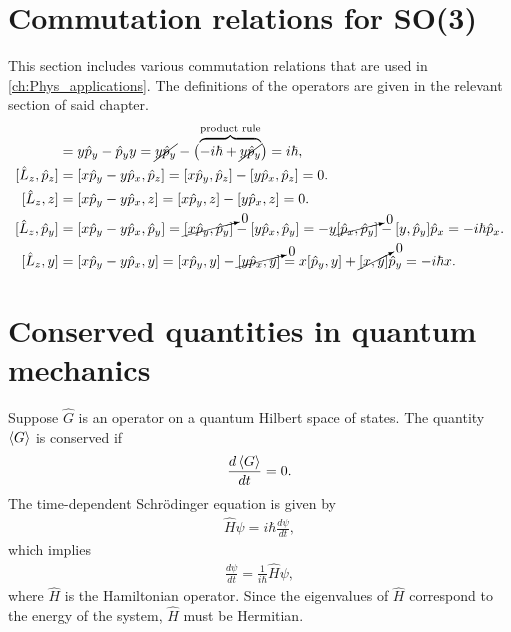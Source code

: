 \section{Commutation relations for SO(3)}\label{sec:SO3_comms}
This section includes various commutation relations that are used in \cref{ch:Phys_applications}. The definitions of the operators are given in the relevant section of said chapter.
\begin{align*}
    [y,\hat{p}_y] &= y\hat{p}_y - \hat{p}_y y = \cancel{y\hat{p}_y} - \bigl(\overbrace{-i\hbar + \cancel{y\hat{p}_y}}^{\textrm{product rule}}\bigr) = i\hbar, \\
    [\hat{L}_z,\hat{p}_z]
        &= [x\hat{p}_y - y\hat{p}_x, \hat{p}_z] = [x\hat{p}_y, \hat{p}_z] - [y\hat{p}_x, \hat{p}_z] = 0. \\
    [\hat{L}_z, z] &= [x\hat{p}_y - y\hat{p}_x, z] = [x\hat{p}_y, z] - [y\hat{p}_x, z] = 0. \\
    [\hat{L}_z,\hat{p}_y] 
        &= [x\hat{p}_y - y\hat{p}_x, \hat{p}_y] = \cancelto{0}{[x\hat{p}_y, \hat{p}_y]} - [y\hat{p}_x, \hat{p}_y] = -y\cancelto{0}{[\hat{p}_x, \hat{p}_y]} - [y, \hat{p}_y]\hat{p}_x = -i\hbar\hat{p}_x. \\
    [\hat{L}_z, y] &= [x\hat{p}_y - y\hat{p}_x, y] = [x\hat{p}_y, y] - \cancelto{0}{[y\hat{p}_x, y]} = x[\hat{p}_y, y] + \cancelto{0}{[x, y]}\hat{p}_y = -i\hbar x.
\end{align*}

\section{Conserved quantities in quantum mechanics}\label{sec:conserved_quantities}


    
    Suppose $\hat{G}$ is an operator on a quantum Hilbert space of states. The quantity $\braket{G}$ is conserved if
    \begin{align*}
        \frac{d\braket{G}}{dt} = 0.
    \end{align*}
    The time-dependent Schr\"odinger equation is given by
    \begin{align*}
        \hat{H}\psi = i\hbar\frac{d\psi}{dt},
    \end{align*}
    which implies
    \begin{align*}
        \frac{d\psi}{dt} = \frac{1}{i\hbar}\hat{H}\psi,
    \end{align*}
    where $\hat{H}$ is the Hamiltonian operator. Since the eigenvalues of $\hat{H}$ correspond to the energy of the system, $\hat{H}$ must be Hermitian.

